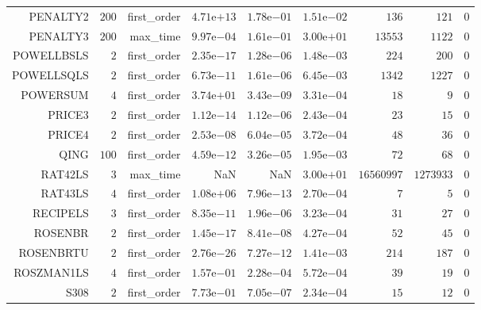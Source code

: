 \begin{longtable}{rrrrrrrrr}
PENALTY2 & \(   200\) & first\_order & \( 4.71\)e\(+13\) & \( 1.78\)e\(-01\) & \( 1.51\)e\(-02\) & \(   136\) & \(   121\) & \(     0\) \\
PENALTY3 & \(   200\) & max\_time & \( 9.97\)e\(-04\) & \( 1.61\)e\(-01\) & \( 3.00\)e\(+01\) & \( 13553\) & \(  1122\) & \(     0\) \\
POWELLBSLS & \(     2\) & first\_order & \( 2.35\)e\(-17\) & \( 1.28\)e\(-06\) & \( 1.48\)e\(-03\) & \(   224\) & \(   200\) & \(     0\) \\
POWELLSQLS & \(     2\) & first\_order & \( 6.73\)e\(-11\) & \( 1.61\)e\(-06\) & \( 6.45\)e\(-03\) & \(  1342\) & \(  1227\) & \(     0\) \\
POWERSUM & \(     4\) & first\_order & \( 3.74\)e\(+01\) & \( 3.43\)e\(-09\) & \( 3.31\)e\(-04\) & \(    18\) & \(     9\) & \(     0\) \\
PRICE3 & \(     2\) & first\_order & \( 1.12\)e\(-14\) & \( 1.12\)e\(-06\) & \( 2.43\)e\(-04\) & \(    23\) & \(    15\) & \(     0\) \\
PRICE4 & \(     2\) & first\_order & \( 2.53\)e\(-08\) & \( 6.04\)e\(-05\) & \( 3.72\)e\(-04\) & \(    48\) & \(    36\) & \(     0\) \\
QING & \(   100\) & first\_order & \( 4.59\)e\(-12\) & \( 3.26\)e\(-05\) & \( 1.95\)e\(-03\) & \(    72\) & \(    68\) & \(     0\) \\
RAT42LS & \(     3\) & max\_time &       NaN &       NaN & \( 3.00\)e\(+01\) & \(16560997\) & \(1273933\) & \(     0\) \\
RAT43LS & \(     4\) & first\_order & \( 1.08\)e\(+06\) & \( 7.96\)e\(-13\) & \( 2.70\)e\(-04\) & \(     7\) & \(     5\) & \(     0\) \\
RECIPELS & \(     3\) & first\_order & \( 8.35\)e\(-11\) & \( 1.96\)e\(-06\) & \( 3.23\)e\(-04\) & \(    31\) & \(    27\) & \(     0\) \\
ROSENBR & \(     2\) & first\_order & \( 1.45\)e\(-17\) & \( 8.41\)e\(-08\) & \( 4.27\)e\(-04\) & \(    52\) & \(    45\) & \(     0\) \\
ROSENBRTU & \(     2\) & first\_order & \( 2.76\)e\(-26\) & \( 7.27\)e\(-12\) & \( 1.41\)e\(-03\) & \(   214\) & \(   187\) & \(     0\) \\
ROSZMAN1LS & \(     4\) & first\_order & \( 1.57\)e\(-01\) & \( 2.28\)e\(-04\) & \( 5.72\)e\(-04\) & \(    39\) & \(    19\) & \(     0\) \\
S308 & \(     2\) & first\_order & \( 7.73\)e\(-01\) & \( 7.05\)e\(-07\) & \( 2.34\)e\(-04\) & \(    15\) & \(    12\) & \(     0\) \\

\end{longtable}

